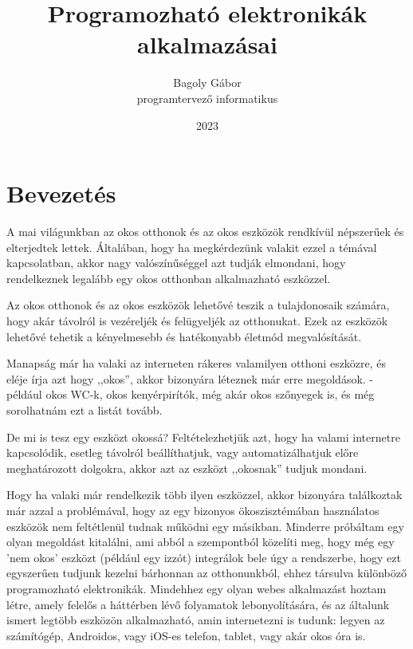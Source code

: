 \documentclass[
]{thesis-ekf}
\theoremstyle{definition}
\theoremstyle{remark}
\begin{document}
	\title{Programozható elektronikák alkalmazásai}
	\author{Bagoly Gábor\\programtervező informatikus}
	\date{2023}
	\maketitle
	\tableofcontents
	
	\chapter*{Bevezetés}
	
	A mai világunkban az okos otthonok és az okos eszközök rendkívül népszerűek és elterjedtek lettek. Általában, hogy ha megkérdezünk valakit ezzel a témával kapcsolatban, akkor nagy valószínűséggel azt tudják elmondani, hogy rendelkeznek legalább egy okos otthonban alkalmazható eszközzel.
	
	Az okos otthonok és az okos eszközök lehetővé teszik a tulajdonosaik számára, hogy akár távolról is vezéreljék és felügyeljék az otthonukat. Ezek az eszközök lehetővé tehetik a kényelmesebb és hatékonyabb életmód megvalósítását.
	
	Manapság már ha valaki az interneten rákeres valamilyen otthoni eszközre, és eléje írja azt hogy ,,okos'', akkor bizonyára léteznek már erre megoldások. - például okos WC-k, okos kenyérpirítók, még akár okos szőnyegek is, és még sorolhatnám ezt a listát tovább. 
	
	De mi is tesz egy eszközt okossá? Feltételezhetjük azt, hogy ha valami internetre kapcsolódik, esetleg távolról beállíthatjuk, vagy automatizálhatjuk előre meghatározott dolgokra, akkor azt az eszközt ,,okosnak'' tudjuk mondani.
	
	Hogy ha valaki már rendelkezik több ilyen eszközzel, akkor bizonyára találkoztak már azzal a problémával, hogy az egy bizonyos ökoszisztémában használatos eszközök nem feltétlenül tudnak működni egy másikban. Minderre próbáltam egy olyan megoldást kitalálni, ami abból a szempontból közelíti meg, hogy még egy 'nem okos' eszközt (például egy izzót) integrálok bele úgy a rendszerbe, hogy ezt egyszerűen tudjunk kezelni bárhonnan az otthonunkból, ehhez társulva különböző programozható elektronikák. Mindehhez egy olyan webes alkalmazást hoztam létre, amely felelős a háttérben lévő folyamatok lebonyolítására, és az általunk ismert legtöbb eszközön alkalmazható, amin internetezni is tudunk: legyen az számítógép, Androidos, vagy iOS-es telefon, tablet, vagy akár okos óra is.
	
\end{document}
